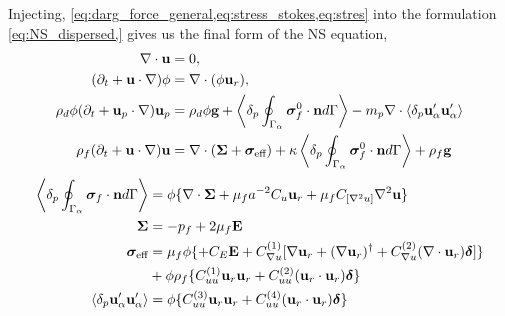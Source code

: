 Injecting, \ref{eq:darg_force_general,eq:stress_stokes,eq:stres} into the formulation \ref{eq:NS_dispersed,} gives us the final form of the NS equation, 
\begin{align}
    \div\textbf{u}&=0, \\
    (\pddt + \textbf{u}\cdot \grad)\phi &= \div(\phi \textbf{u}_r), \\
    \rho_d\phi (\pddt + \textbf{u}_p \cdot \grad)  \textbf{u}_p
    &= 
    \rho_d \phi \textbf{g}
    + 
        \pSavg{\bm\sigma_f^0 \cdot \textbf{n}}
        - m_p \div \pavg{\textbf{u}_\alpha'\textbf{u}_\alpha'}
    \\
    \rho_f (\pddt 
    + \textbf{u}\cdot \grad)
    \textbf{u}
    &= 
    \div (\bm\Sigma
    +  \bm{\sigma}_\text{eff} )
    + \kappa \pSavg{ \bm{\sigma}_f^0 \cdot \textbf{n}} 
    + \rho_f \textbf{g} 
    \label{eq:dtu_bulk}
\end{align}
\begin{align*}
    \left<\delta_p \oint_{\Gamma_{\alpha}} \bm\sigma_f\cdot \textbf{n} d\Gamma\right> &= 
     \phi \{
    \mathbf{\nabla}\cdot \bm\Sigma
    + 
    \mu_f a^{-2}
    C_u \textbf{u}_{r}
    +\mu_f C_{[\mathbf{\nabla}^2 u]} \mathbf{\nabla}^2 \textbf{u}
    \} 
    \\
    \bm\Sigma &= - p_f +2 \mu_f \textbf{E}\\
    \bm\sigma_\text{eff} &= 
    \mu_f \phi 
    \{ 
    + C_E  \textbf{E}
    +  C_{\mathbf{\nabla} u}^{(1)} [\mathbf{\nabla} \textbf{u}_{r} +(\mathbf{\nabla} \textbf{u}_{r})^\dagger + C_{\mathbf{\nabla} u}^{(2)}(\mathbf{\nabla}\cdot  \textbf{u}_{r})\bm\delta] \}\\
    &+\phi \rho_f \{ C_{uu}^{(1)}
    \textbf{u}_{r}\textbf{u}_{r} 
    + C_{uu}^{(2)} (\textbf{u}_{r}\cdot \textbf{u}_{r}) \bm\delta \}\\
    \left<\delta_p \textbf{u}_\alpha'\textbf{u}_\alpha'\right> &= 
    \phi \{ C_{uu}^{(3)}
    \textbf{u}_{r}\textbf{u}_{r} 
    + C_{uu}^{(4)} (\textbf{u}_{r}\cdot \textbf{u}_{r}) \bm\delta \}
\end{align*}
